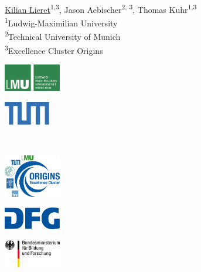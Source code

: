 \begin{frame}{}
	\begin{center}
		{
			{
				
				\Large \inserttitle
			}\\[0.7ex]
			{
				\large \insertsubtitle
			}
		}\\[2ex]
		\underline{Kilian Lieret}\textsuperscript{1,3}, Jason Aebischer\textsuperscript{2, 3}, Thomas Kuhr\textsuperscript{1,3}\\[2ex]
		{
			\footnotesize
			\textsuperscript{1}Ludwig-Maximilian University\\[0ex]
			\textsuperscript{2}Technical University of Munich\\[0ex]
			\vspace{-1ex}\textsuperscript{3}Excellence Cluster Origins
		}\\[2.5ex]
		\insertdate
	\end{center}
	\vspace{2ex}
	\centering
	{
		\begin{minipage}{3cm}
		\includegraphics[width=2.5cm]{figures/logos/lmu_logo.pdf}
		\end{minipage}
	}
	{
		\begin{minipage}{3cm}
			\includegraphics[width=2.0cm]{figures/logos/tum.pdf}
		\end{minipage}
	}\\[2ex]
	{
		\begin{minipage}{3cm}
			\includegraphics[width=2.5cm]{figures/logos/cluster.pdf}
		\end{minipage}
	}%
	{
		\begin{minipage}{3cm}
			\includegraphics[width=2.5cm]{figures/logos/dfg.pdf}
		\end{minipage}
	}
	{
		\begin{minipage}{3cm}
			\includegraphics[width=2.5cm]{figures/logos/bmbf.pdf}
		\end{minipage}
	}
\end{frame}